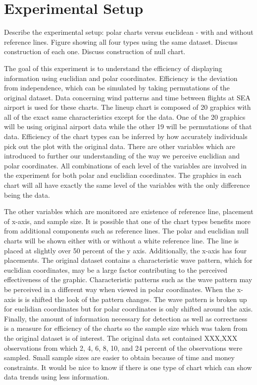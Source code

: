 \section{Experimental Setup}
Describe the experimental setup: polar charts versus euclidean - with and without reference lines.
Figure showing all four types using the same dataset. 
Discuss construction of each one. Discuss construction of null chart.

The goal of this experiment is to understand the efficiency of displaying information using euclidian and polar coordinates. Efficiency is the deviation from independence, which can be simulated by taking permutations of the original dataset. Data concerning wind patterns and time between flights at SEA airport is used for these charts. The lineup chart is composed of 20 graphics with all of the exact same characteristics except for the data. One of the 20 graphics will be using original airport data while the other 19 will be permutations of that data. Efficiency of the chart types can be inferred by how accurately individuals pick out the plot with the original data. There are other variables which are introduced to further our understanding of the way we perceive euclidian and polar coordinates. All combinations of each level of the variables are involved in the experiment for both polar and euclidian coordinates. The graphics in each chart will all have exactly the same level of the variables with the only difference being the data. 

The other variables which are monitored are existence of reference line, placement of x-axis, and sample size. It is possible that one of the chart types benefits more from additional components such as reference lines. The polar and euclidian null charts will be shown either with or without a white reference line. The line is placed at slightly over 50 percent of the y axis. Additionally, the x-axis has four placements. The original dataset contains a characteristic wave pattern, which for euclidian coordinates, may be a large factor contributing to the perceived effectiveness of the graphic. Characteristic patterns such as the wave pattern may be perceived in a different way when viewed in polar coordinates. When the x-axis is is shifted the look of the pattern changes. The wave pattern is broken up for euclidian coordinates but for polar coordinates is only shifted around the axis. Finally, the amount of information necessary for detection as well as correctness is a measure for efficiency of the charts so the sample size which was taken from the original dataset is of interest. The original data set contained XXX,XXX observations from which 2, 4, 6, 8, 10, and 24 percent of the observations were sampled. Small sample sizes are easier to obtain because of time and money constraints. It would be nice to know if there is one type of chart which can show data trends using less information. 


